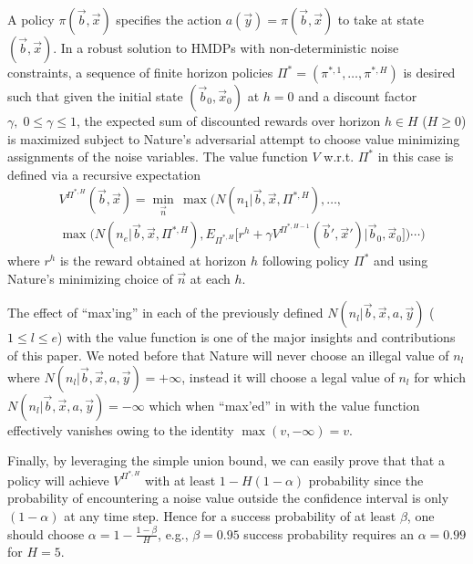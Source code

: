 \documentclass[letterpaper]{article}
\begin{document}

A policy $\pi(\vec{b},\vec{x})$ specifies the action $a(\vec{y}) =
\pi(\vec{b},\vec{x})$ to take at state $(\vec{b},\vec{x})$.  
In a robust solution to HMDPs with non-deterministic noise constraints, 
a sequence of finite horizon policies $\Pi^* = (\pi^{*,1},\ldots,\pi^{*,H})$ is desired such that given the initial state $(\vec{b}_0,\vec{x}_0)$ at $h=0$ and  a discount factor $\gamma, \; 0 \leq \gamma \leq 1$, the expected sum of discounted rewards over horizon $h \in H$ ($H \geq 0$) is maximized subject to Nature's
adversarial attempt to choose value minimizing assignments of the noise variables.  The
value function $V$ w.r.t. $\Pi^*$ in this case is defined via a recursive expectation
{\footnotesize
\begin{align*} 
& V^{\Pi^{*,H}}(\vec{b},\vec{x}) = \min_{\vec{n}} \, \max\!\Big(N(n_1|\vec{b},\vec{x},\Pi^{*,H}),\ldots,\\
& \max\!\Big(N(n_e|\vec{b},\vec{x},\Pi^{*,H}), E_{\Pi^{*,H}} \Big[ r^h \!\! + \! \gamma V^{\Pi^{*,H-1}} \! \! (\vec{b}',\!\vec{x}') \Big| \vec{b}_0,\!\vec{x}_0\Big] \Big) \!\! \cdots \!\! \Big)
\end{align*}}                   
where $r^h$ is the reward obtained at horizon $h$ following policy $\Pi^*$ and using
Nature's minimizing choice of $\vec{n}$ at each $h$.

The effect of ``max'ing'' in each of the previously defined
$N(n_l| \vec{b},\vec{x},a,\vec{y})$ ($1 \leq l \leq e$) with the value
function is one of the major insights and contributions of this paper.
We noted before that Nature will never choose an illegal value of
$n_l$ where $N(n_l| \vec{b},\vec{x},a,\vec{y}) = +\infty$, instead it
will choose a legal value of $n_l$ for which
$N(n_l| \vec{b},\vec{x},a,\vec{y}) = -\infty$ which when ``max'ed'' in
with the value function effectively vanishes owing to the identity
$\max(v,-\infty) = v$.

Finally, by leveraging the simple union bound, we can easily prove that
that a policy will achieve $V^{\Pi^{*,H}}$ with at least $1 - H(1-\alpha)$
probability since the probability of encountering a noise value
outside the confidence interval is only $(1-\alpha)$ at any time step.
Hence for a success probability of at least $\beta$, one should choose
$\alpha = 1 - \frac{1 - \beta}{H}$, e.g., $\beta = 0.95$ success probability
requires an $\alpha = 0.99$ for $H=5$.
\end{document}
